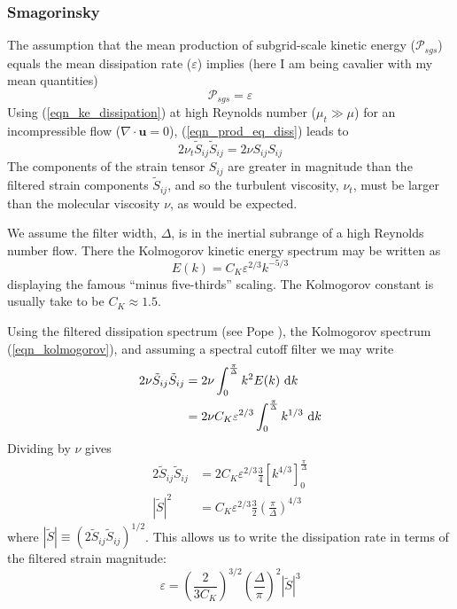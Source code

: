 \subsubsection*{Smagorinsky}

The assumption that the mean production of subgrid-scale kinetic energy ($\mathcal{P}_{sgs}$) equals the mean dissipation rate ($\varepsilon$) implies (here I am being cavalier with my mean quantities)
\begin{equation}
\label{eqn_prod_eq_diss}
\mathcal{P}_{sgs} = \varepsilon
\end{equation}
Using (\ref{eqn_ke_dissipation}) at high Reynolds number ($\mu_t \gg \mu$) for an incompressible flow ($\nabla\!\cdot\mathbf{u} = 0$), (\ref{eqn_prod_eq_diss}) leads to
\begin{equation}
2\nu_t \tilde{S}_{ij}\tilde{S}_{ij} = 2\nu S_{ij} S_{ij}
\end{equation}
The components of the strain tensor $S_{ij}$ are greater in magnitude than the filtered strain components $\tilde{S}_{ij}$, and so the turbulent viscosity, $\nu_t$, must be larger than the molecular viscosity $\nu$, as would be expected.

We assume the filter width, $\Delta$, is in the inertial subrange of a high Reynolds number flow.  There the Kolmogorov kinetic energy spectrum may be written as
\begin{equation}
\label{eqn_kolmogorov}
E(k) = C_K \varepsilon^{2/3} k^{-5/3}
\end{equation}
displaying the famous ``minus five-thirds'' scaling.  The Kolmogorov constant is usually take to be $C_K \approx 1.5$.

Using the filtered dissipation spectrum (see Pope \cite{Pope:2000}), the Kolmogorov spectrum (\ref{eqn_kolmogorov}), and assuming a spectral cutoff filter we may write
\begin{align}
2 \nu \tilde{S}_{ij}\tilde{S}_{ij} &= 2 \nu \int_0^{\frac{\pi}{\Delta}} k^2 E(k) \,\,\mathrm{d} k \\
&= 2 \nu C_K \varepsilon^{2/3} \int_0^{\frac{\pi}{\Delta}} k^{1/3} \,\,\mathrm{d} k
\end{align}
Dividing by $\nu$ gives
\begin{align}
2 \tilde{S}_{ij}\tilde{S}_{ij} &= 2 C_K \varepsilon^{2/3} \frac{3}{4} \left[ k^{4/3} \right]_0^{\frac{\pi}{\Delta}} \\
|\tilde{S}|^2 &= C_K \varepsilon^{2/3} \frac{3}{2} \left(\frac{\pi}{\Delta}\right)^{4/3}
\end{align}
where $|\tilde{S}| \equiv (2 \tilde{S}_{ij}\tilde{S}_{ij})^{1/2}$.  This allows us to write the dissipation rate in terms of the filtered strain magnitude:
\begin{equation}
\label{eqn_diss_strain}
\varepsilon = \left(\frac{2}{3 C_K}\right)^{3/2} \left(\frac{\Delta}{\pi}\right)^2 |\tilde{S}|^3
\end{equation}

